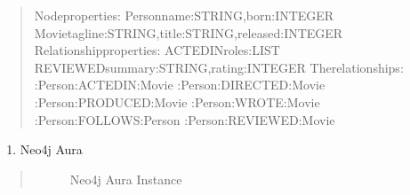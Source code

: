 \documentclass[letterpaper,11pt,english]{sphinxmanual}
\begin{document}
\begin{itemize}
\begin{quote}
\begin{sphinxVerbatim}[commandchars=\\\{\}]
Nodeproperties:
Personname:STRING,born:INTEGER
Movietagline:STRING,title:STRING,released:INTEGER
Relationshipproperties:
ACTED\PYGZus{}INroles:LIST
REVIEWEDsummary:STRING,rating:INTEGER
Therelationships:
:Person\PYGZhy{}\PYG{o}{[}:ACTED\PYGZus{}IN\PYG{o}{]}\PYGZhy{}\PYGZgt{}:Movie
:Person\PYGZhy{}\PYG{o}{[}:DIRECTED\PYG{o}{]}\PYGZhy{}\PYGZgt{}:Movie
:Person\PYGZhy{}\PYG{o}{[}:PRODUCED\PYG{o}{]}\PYGZhy{}\PYGZgt{}:Movie
:Person\PYGZhy{}\PYG{o}{[}:WROTE\PYG{o}{]}\PYGZhy{}\PYGZgt{}:Movie
:Person\PYGZhy{}\PYG{o}{[}:FOLLOWS\PYG{o}{]}\PYGZhy{}\PYGZgt{}:Person
:Person\PYGZhy{}\PYG{o}{[}:REVIEWED\PYG{o}{]}\PYGZhy{}\PYGZgt{}:Movie
\end{sphinxVerbatim}
\end{quote}
\begin{enumerate}
%
\setcounter{enumi}{1}
\item {} 
\sphinxAtStartPar
Neo4j Aura

\end{enumerate}
\begin{quote}

\begin{figure}[htbp]
\centering
\capstart

\noindent{}
\caption{Neo4j Aura Instance}\label{\detokenize{rag:id70}}\label{\detokenize{rag:fig-neo4j-aura-free}}\end{figure}
\end{quote}

\begin{sphinxVerbatim}[commandchars=\\\{\}]
\PYG{p}{[}\PYG{p}{]}  
\PYG{p}{[}\PYG{p}{]}  
\PYG{p}{[}\PYG{p}{]}  


\end{sphinxVerbatim}
\end{itemize}
\end{document}
